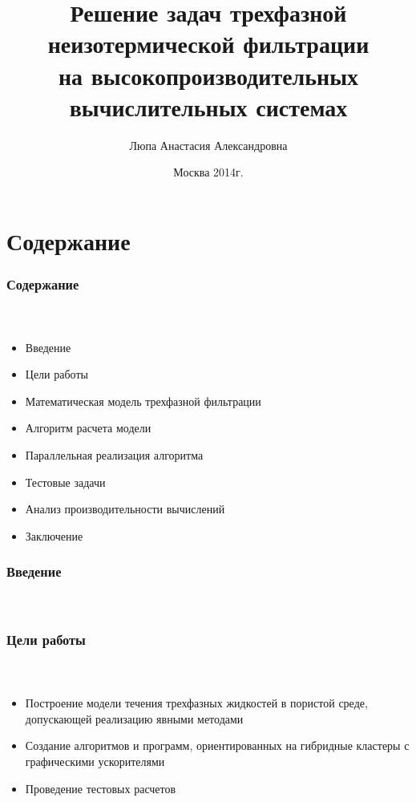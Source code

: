 \documentclass[10pt,pdf,hyperref={unicode}]{beamer} %
\title{ Решение задач трехфазной неизотермической фильтрации \\
на высокопроизводительных вычислительных системах}
\author{Люпа Анастасия Александровна}
\institute{Московский физико-технический институт \\
(государственный университет)\\
Факультет управления и прикладной математики \\
Кафедра математического моделирования \\
    \vspace{0.2cm}
    Научный руководитель: с.н.с., к.ф.-м.н. Чурбанова Н.Г.\\
}
\date{
    Москва 2014г.
}
\begin{document}
\begin{frame}
  \maketitle
\end{frame}

\section{Содержание}

\begin{frame}
\begin{center}
\frametitle{Содержание}
\framesubtitle{\ }
\begin{itemize}
\item {\large Введение}
\vspace{0.3cm}
\item {\large Цели работы}
\vspace{0.3cm}
\item {\large Математическая модель трехфазной фильтрации}
\vspace{0.3cm}
\item {\large Алгоритм расчета модели}
\vspace{0.3cm}
\item {\large Параллельная реализация алгоритма}
\vspace{0.3cm}
\item {\large Тестовые задачи}
\vspace{0.3cm}
\item {\large Анализ производительности вычислений}
\vspace{0.3cm}
\item {\large Заключение}
\end{itemize}
\end{center}
\end{frame}

\begin{frame}
\begin{center}
\frametitle{Введение}
\framesubtitle{\ }
\end{center}
\end{frame}

\begin{frame}
\begin{center}
\frametitle{Цели работы}
\framesubtitle{\ }
\begin{itemize}
\item {\large Построение модели течения трехфазных жидкостей в пористой среде, допускающей реализацию явными методами\\}
\vspace{0.5cm}
\item {\large Создание алгоритмов и программ, ориентированных на гибридные кластеры с графическими ускорителями\\}
\vspace{0.5cm}
\item {\large Проведение тестовых расчетов}
\end{itemize}
\end{center}
\end{frame}
\end{document}

